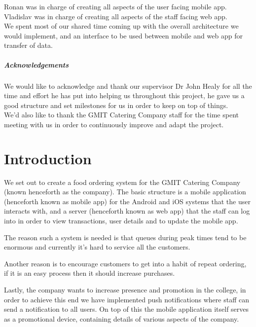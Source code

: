 Ronan was in charge of creating all aspects of the user facing mobile app. 
Vladislav was in charge of creating all aspects of the staff facing web app.
\\

We spent most of our shared time coming up with the overall architecture we would implement, and an interface to be used between mobile and web app for transfer of data.
\pagebreak

\paragraph{Acknowledgements}
We would like to acknowledge and thank our supervisor Dr John Healy for all the time and effort he has put into helping us throughout this project, he gave us a good structure and set milestones for us in order to keep on top of things.
\\

We'd also like to thank the GMIT Catering Company staff for the time spent meeting with us in order to continuously improve and adapt the project.

\chapter{Introduction}	%
We set out to create a food ordering system for the GMIT Catering Company (known henceforth as the company).
The basic structure is a mobile application (henceforth known as mobile app) for the Android and iOS systems that the user interacts with, and a server (henceforth known as web app) that the staff can log into in order to view transactions, user details and to update the mobile app.

The reason such a system is needed is that queues during peak times tend to be enormous and currently it's hard to service all the customers.

Another reason is to encourage customers to get into a habit of repeat ordering, if it is an easy process then it should increase purchases.

Lastly, the company wants to increase presence and promotion in the college, in order to achieve this end we have implemented push notifications where staff can send a notification to all users. On top of this the mobile application itself serves as a promotional device, containing details of various aspects of the company.
\\

